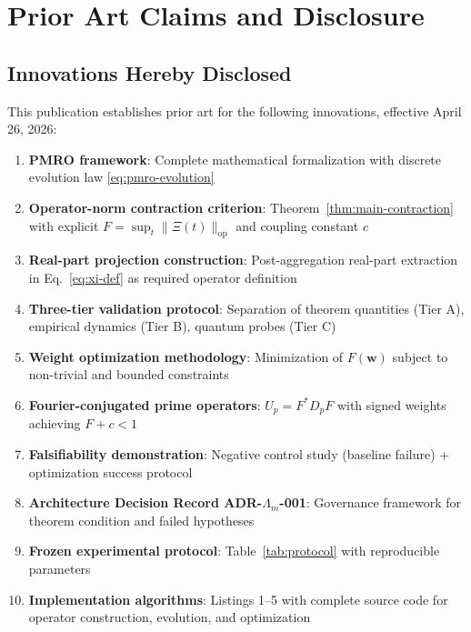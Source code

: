 \documentclass[11pt,a4paper]{article}
\begin{document}
\section{Prior Art Claims and Disclosure}

\subsection{Innovations Hereby Disclosed}

This publication establishes prior art for the following innovations, effective April 26, 2026:

\begin{enumerate}
\item \textbf{PMRO framework}: Complete mathematical formalization with discrete evolution law \eqref{eq:pmro-evolution}

\item \textbf{Operator-norm contraction criterion}: Theorem~\ref{thm:main-contraction} with explicit \(F = \sup_t \|\Xi(t)\|_{\mathrm{op}}\) and coupling constant \(c\)

\item \textbf{Real-part projection construction}: Post-aggregation real-part extraction in Eq.~\eqref{eq:xi-def} as required operator definition

\item \textbf{Three-tier validation protocol}: Separation of theorem quantities (Tier A), empirical dynamics (Tier B), quantum probes (Tier C)

\item \textbf{Weight optimization methodology}: Minimization of \(F(\mathbf{w})\) subject to non-trivial and bounded constraints

\item \textbf{Fourier-conjugated prime operators}: \(U_p = F^* D_p F\) with signed weights achieving \(F+c<1\)

\item \textbf{Falsifiability demonstration}: Negative control study (baseline failure) + optimization success protocol

\item \textbf{Architecture Decision Record ADR-\(\Lambda_m\)-001}: Governance framework for theorem condition and failed hypotheses

\item \textbf{Frozen experimental protocol}: Table~\ref{tab:protocol} with reproducible parameters

\item \textbf{Implementation algorithms}: Listings 1–5 with complete source code for operator construction, evolution, and optimization
\end{enumerate}
\end{document}
